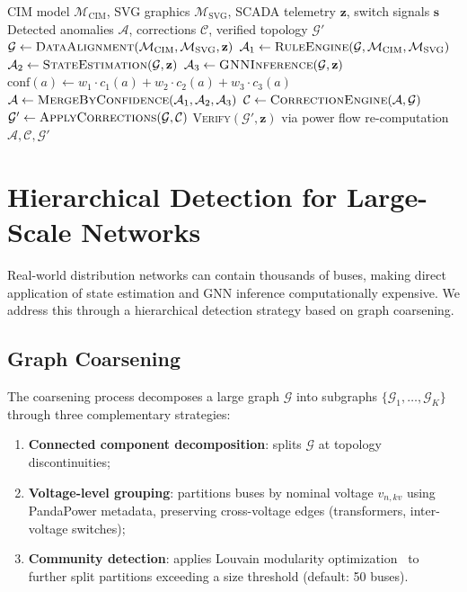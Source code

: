 \documentclass[research]{fcs}
\begin{document}
\begin{algorithm}[htbp]
\caption{Three-Layer Hybrid Topology Anomaly Detection}
\label{alg:detection}
\begin{algorithmic}[1]
\REQUIRE CIM model $\mathcal{M}_{\text{CIM}}$, SVG graphics $\mathcal{M}_{\text{SVG}}$, SCADA telemetry $\mathbf{z}$, switch signals $\mathbf{s}$
\ENSURE Detected anomalies $\mathcal{A}$, corrections $\mathcal{C}$, verified topology $\mathcal{G}'$
\STATE $\mathcal{G} \leftarrow \textsc{DataAlignment}(\mathcal{M}_{\text{CIM}}, \mathcal{M}_{\text{SVG}}, \mathbf{z})$
\STATE $\mathcal{A}_1 \leftarrow \textsc{RuleEngine}(\mathcal{G}, \mathcal{M}_{\text{CIM}}, \mathcal{M}_{\text{SVG}})$
\STATE $\mathcal{A}_2 \leftarrow \textsc{StateEstimation}(\mathcal{G}, \mathbf{z})$
\STATE $\mathcal{A}_3 \leftarrow \textsc{GNNInference}(\mathcal{G}, \mathbf{z})$
    \STATE $\text{conf}(a) \leftarrow w_1 \cdot c_1(a) + w_2 \cdot c_2(a) + w_3 \cdot c_3(a)$
\ENDFOR
\STATE $\mathcal{A} \leftarrow \textsc{MergeByConfidence}(\mathcal{A}_1, \mathcal{A}_2, \mathcal{A}_3)$
\STATE $\mathcal{C} \leftarrow \textsc{CorrectionEngine}(\mathcal{A}, \mathcal{G})$
\STATE $\mathcal{G}' \leftarrow \textsc{ApplyCorrections}(\mathcal{G}, \mathcal{C})$
\STATE \textsc{Verify}$(\mathcal{G}', \mathbf{z})$ via power flow re-computation
\RETURN $\mathcal{A}, \mathcal{C}, \mathcal{G}'$
\end{algorithmic}
\end{algorithm}

\section{Hierarchical Detection for Large-Scale Networks}

Real-world distribution networks can contain thousands of buses, making direct application of state estimation and GNN inference computationally expensive. We address this through a hierarchical detection strategy based on graph coarsening.

\subsection{Graph Coarsening}

The coarsening process decomposes a large graph $\mathcal{G}$ into subgraphs $\{\mathcal{G}_1, \ldots, \mathcal{G}_K\}$ through three complementary strategies:

\begin{enumerate}
\item \textbf{Connected component decomposition}: splits $\mathcal{G}$ at topology discontinuities;
\item \textbf{Voltage-level grouping}: partitions buses by nominal voltage $v_{n,kv}$ using PandaPower metadata, preserving cross-voltage edges (transformers, inter-voltage switches);
\item \textbf{Community detection}: applies Louvain modularity optimization~\cite{louvain2008} to further split partitions exceeding a size threshold (default: 50 buses).
\end{enumerate}
\end{document}
